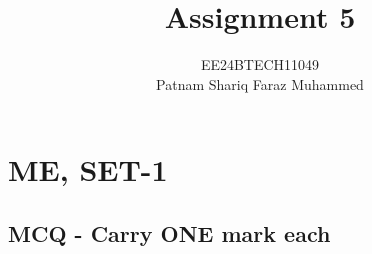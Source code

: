 \documentclass[journal]{IEEEtran}
\numberwithin{equation}{enumi}
\numberwithin{figure}{enumi}
\begin{document}


\title{Assignment 5}
\author{EE24BTECH11049 \\ Patnam Shariq Faraz Muhammed}

{\let\newpage\relax\maketitle}
\section{ME, SET-1}
\subsection{MCQ - Carry ONE mark each}
\end{document}
